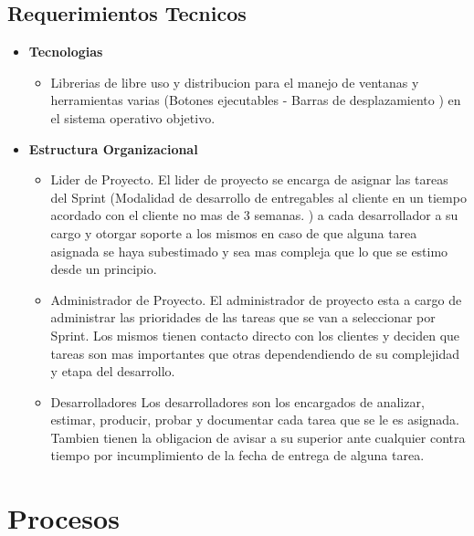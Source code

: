 \documentclass[
10pt, %
a4paper, %
oneside, %
headinclude,footinclude, %
BCOR5mm, %
]{scrartcl}
\begin{document}
\subsection{Requerimientos Tecnicos}
\begin{itemize}
  \item \textbf {Tecnologias}
  \begin{itemize}
    \item Librerias de libre uso y distribucion para el manejo de ventanas
          y herramientas varias (Botones ejecutables - Barras de desplazamiento )
          en el sistema operativo objetivo.
  \end{itemize}

  \item \textbf {Estructura Organizacional}
  \begin{itemize}
    \item Lider de Proyecto.
            El lider de proyecto se encarga de asignar las tareas del
            Sprint (Modalidad de desarrollo de entregables al cliente en un
                     tiempo acordado con el cliente no mas de 3 semanas. )
            a cada desarrollador a su cargo y otorgar soporte a los mismos
            en caso de que alguna tarea asignada se haya subestimado y sea
            mas compleja que lo que se estimo desde un principio.
    \item Administrador de Proyecto.
            El administrador de proyecto esta a cargo de administrar las
            prioridades de las tareas que se van a seleccionar por Sprint.
            Los mismos tienen contacto directo con los clientes y deciden
            que tareas son mas importantes que otras dependendiendo de su
            complejidad y etapa del desarrollo.
    \item Desarrolladores
            Los desarrolladores son los encargados de analizar, estimar,
            producir, probar y documentar cada tarea que se le es asignada.
            Tambien tienen la obligacion de avisar a su superior ante cualquier
            contra tiempo por incumplimiento de la fecha de entrega de alguna tarea.
  \end{itemize}
\end{itemize}

\section{Procesos}
\end{document}

